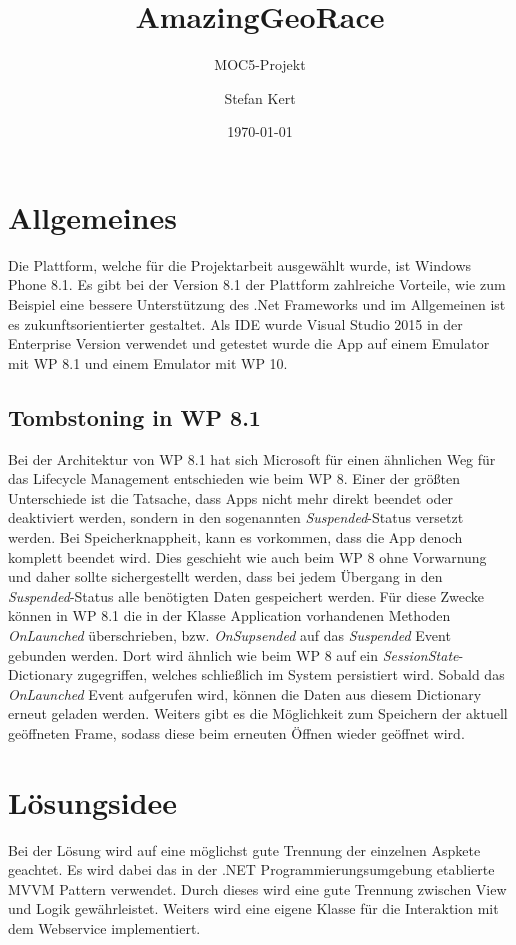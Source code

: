 \documentclass[a4paper,ngerman]{scrartcl}
\begin{document}
\title{AmazingGeoRace}
\subtitle{MOC5-Projekt}
\author{Stefan Kert}
\date{\today}
\maketitle
\section{Allgemeines}
Die Plattform, welche für die Projektarbeit ausgewählt wurde, ist Windows Phone 8.1. Es gibt bei der Version 8.1 der Plattform zahlreiche Vorteile, wie zum Beispiel eine bessere Unterstützung des .Net Frameworks und im Allgemeinen ist es zukunftsorientierter gestaltet. Als IDE wurde Visual Studio 2015 in der Enterprise Version verwendet und getestet wurde die App auf einem Emulator mit WP 8.1 und einem Emulator mit WP 10. 

\subsection{Tombstoning in WP 8.1}
Bei der Architektur von WP 8.1 hat sich Microsoft für einen ähnlichen Weg für das Lifecycle Management entschieden wie beim WP 8. Einer der größten Unterschiede ist die Tatsache, dass Apps nicht mehr direkt beendet oder deaktiviert werden, sondern in den sogenannten \textit{Suspended}-Status versetzt werden. Bei Speicherknappheit, kann es vorkommen, dass die App denoch komplett beendet wird. Dies geschieht wie auch beim WP 8 ohne Vorwarnung und daher sollte sichergestellt werden, dass bei jedem Übergang in den \textit{Suspended}-Status alle benötigten Daten gespeichert werden. Für diese Zwecke können in WP 8.1 die in der Klasse Application vorhandenen Methoden \textit{OnLaunched} überschrieben, bzw. \textit{OnSupsended} auf das \textit{Suspended} Event gebunden werden. Dort wird ähnlich wie beim WP 8 auf ein \textit{SessionState}-Dictionary zugegriffen, welches schließlich im System persistiert wird. Sobald das \textit{OnLaunched} Event aufgerufen wird, können die Daten aus diesem Dictionary erneut geladen werden. Weiters gibt es die Möglichkeit zum Speichern der aktuell geöffneten Frame, sodass diese beim erneuten Öffnen wieder geöffnet wird. 

\newpage
\section{Lösungsidee}
Bei der Lösung wird auf eine möglichst gute Trennung der einzelnen Aspkete geachtet. Es wird dabei das in der .NET Programmierungsumgebung etablierte MVVM Pattern  verwendet. Durch dieses wird eine gute Trennung zwischen View und Logik gewährleistet. Weiters wird eine eigene Klasse für die Interaktion mit dem Webservice implementiert. 
\end{document}
